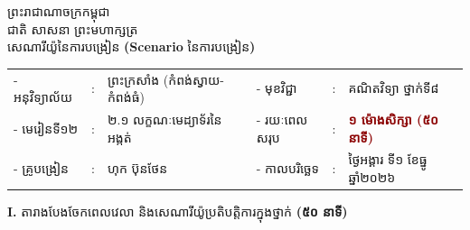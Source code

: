 \documentclass[a4paper,10pt]{article}
\newcommand{\enbf}[1]{{\TimesEn\textbf{#1}}}
\begin{document}
\fontsize{9.8pt}{14.6pt}\selectfont

\begin{center}
  {\muol\fontsize{11pt}{16pt}\selectfont ព្រះរាជាណាចក្រកម្ពុជា}\\[1pt]
  {\muol\fontsize{10pt}{15pt}\selectfont ជាតិ សាសនា ព្រះមហាក្សត្រ}\\[4pt]
  {\muol\fontsize{10.5pt}{15pt}\selectfont សេណារីយ៉ូនៃការបង្រៀន \enbf{(Scenario} នៃការបង្រៀន\enbf{)}}
\end{center}

\vspace{3pt}
{\renewcommand{\arraystretch}{1.10}
\begin{tabular}{@{}l l l p{0.5cm} l l l@{}}
  - អនុវិទ្យាល័យ & : & ព្រះក្រសាំង (កំពង់ស្វាយ-កំពង់ធំ) & & - មុខវិជ្ជា & : & គណិតវិទ្យា ថ្នាក់ទី៨ \\
  - មេរៀនទី១២ & : & ២.១ លក្ខណៈមេដ្យាទ័រនៃអង្កត់ & & - រយៈពេលសរុប & : & \textcolor{darkred}{\textbf{១ ម៉ោងសិក្សា (៥០ នាទី)}} \\
  - គ្រូបង្រៀន & : & ហុក ប៊ុនថែន & & - កាលបរិច្ឆេទ & : & ថ្ងៃអង្គារ ទី១ ខែធ្នូ ឆ្នាំ២០២៦ \\
\end{tabular}
}

\vspace{4pt}

\textbf{I.} {\muol តារាងបែងចែកពេលវេលា និងសេណារីយ៉ូប្រតិបត្តិការក្នុងថ្នាក់} \textbf{(៥០ នាទី)}
\end{document}
